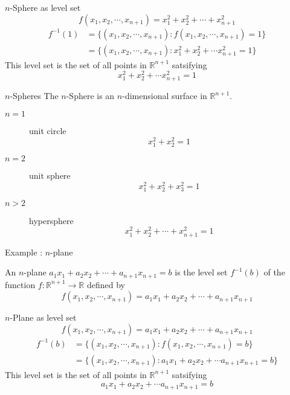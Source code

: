 \documentclass{beamer}
\begin{document}
\begin{frame}{$n$-Sphere as level set}
	$$f(x_1,x_2,\cdots,x_{n+1}) = x_1^2+x_2^2+\cdots+x_{n+1}^2$$
\begin{align*}
	f^{-1}(1) & = \{(x_1,x_2,\cdots,x_{n+1}) : f(x_1,x_2,\cdots,x_{n+1}) = 1\} \\
	& = \{ (x_1,x_2,\cdots,x_{n+1}) : x_1^2 + x_2^2 + \cdots x_{n+1}^2 = 1\}
\end{align*}
	This level set is the set of all points in $\mathbb{R}^{n+1}$ satsifying 
\begin{equation}
	x_1^2 + x_2^2 + \cdots x_{n+1}^2 = 1
\end{equation}
\end{frame}

\begin{frame}{$n$-Spheres}
	The $n$-Sphere is an $n$-dimensional surface in $\mathbb{R}^{n+1}$.
\begin{description}
	\item[$n=1$] unit circle
		$$x_1^2 + x_2^2 = 1$$
	\item[$n=2$] unit sphere
		$$x_1^2 + x_2^2 + x_3^2 = 1$$
	\item[$n>2$] hypersphere
		$$x_1^2 + x_2^2 + \cdots + x_{n+1}^2 = 1$$
\end{description}
\end{frame}

\begin{frame}{Example : $n$-plane}
\begin{definition}[$n$-plane]
	An $n$-plane $a_1x_1 + a_2x_2 + \cdots + a_{n+1}x_{n+1} = b$ is the level set $f^{-1}(b)$ of the function $f: \mathbb{R}^{n+1}\to \mathbb{R}$ defined by
\begin{equation}
	f(x_1,x_2,\cdots,x_{n+1}) = a_1x_1 + a_2x_2 + \cdots + a_{n+1}x_{n+1}
\end{equation}
\end{definition}
\end{frame}

\begin{frame}{$n$-Plane as level set}
	$$f(x_1,x_2,\cdots,x_{n+1}) = a_1x_1 + a_2x_2 + \cdots + a_{n+1}x_{n+1}$$
\begin{align*}
	f^{-1}(b) & = \{(x_1,x_2,\cdots,x_{n+1}) : f(x_1,x_2,\cdots,x_{n+1}) = b\} \\
	& = \{ (x_1,x_2,\cdots,x_{n+1}) : a_1x_1 + a_2x_2 + \cdots a_{n+1}x_{n+1} = b\}
\end{align*}
	This level set is the set of all points in $\mathbb{R}^{n+1}$ satsifying 
\begin{equation}
	a_1x_1 + a_2x_2 + \cdots a_{n+1}x_{n+1} = b
\end{equation}
\end{frame}
\end{document}
